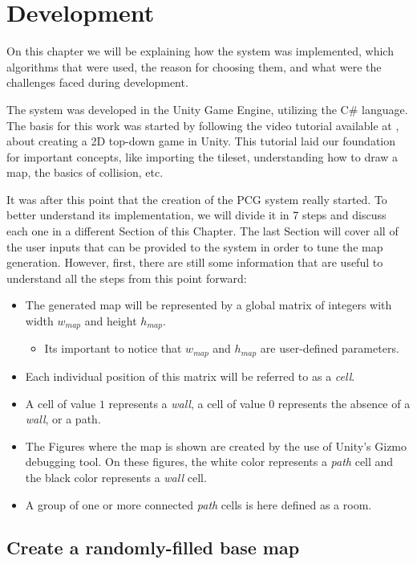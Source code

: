 \chapter{Development}
\label{chapter:dev}

On this chapter we will be explaining how the system was implemented, which algorithms that were used, the reason for choosing them, and what were the challenges faced during development.

The system was developed in the Unity Game Engine, utilizing the C\# language. The basis for this work was started by following the video tutorial available at \textcite{taft:2019}, about creating a 2D top-down game in Unity. This tutorial laid our foundation for important concepts, like importing the tileset, understanding how to draw a map, the basics of collision, etc.

It was after this point that the creation of the PCG system really started. To better understand its implementation, we will divide it in 7 steps and discuss each one in a different Section of this Chapter. The last Section will cover all of the user inputs that can be provided to the system in order to tune the map generation. However, first, there are still some information that are useful to understand all the steps from this point forward: 
\begin{itemize}
    \item The generated map will be represented by a global matrix of integers with width \(w_{map}\) and height \(h_{map}\).
    \begin{itemize}
        \item Its important to notice that \(w_{map}\) and \(h_{map}\) are user-defined parameters.
    \end{itemize}
    \item Each individual position of this matrix will be referred to as a \emph{cell}.
    \item A cell of value \(1\) represents a \emph{wall}, a cell of value \(0\) represents the absence of a \emph{wall}, or a path.
    \item The Figures where the map is shown are created by the use of Unity's Gizmo debugging tool. On these figures, the white color represents a \emph{path} cell and the black color represents a \emph{wall} cell.
    \item A group of one or more connected \emph{path} cells is here defined as a room.
\end{itemize}

\section{Create a randomly-filled base map}
\label{sec:randomf}

